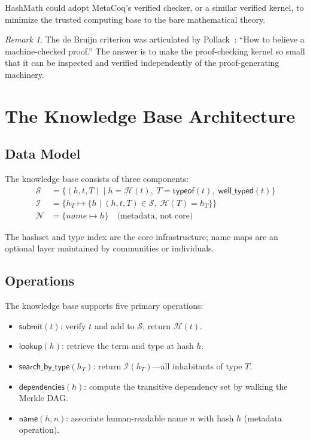\documentclass[11pt]{article}
\theoremstyle{definition}
\theoremstyle{plain}
\theoremstyle{remark}
\newtheorem{remark}{Remark}[section]
\newcommand{\hash}{\mathcal{H}}
\newcommand{\hashset}{\mathcal{S}}
\newcommand{\typeindex}{\mathcal{I}}
\newcommand{\namemap}{\mathcal{N}}
\begin{document}
HashMath could adopt MetaCoq's verified checker, or a similar verified kernel, to minimize
the trusted computing base to the bare mathematical theory.

\begin{remark}
The de Bruijn criterion was articulated by Pollack~\cite{pollack1998}: ``How to believe a
machine-checked proof.''
The answer is to make the proof-checking kernel so small that it can be inspected and verified
independently of the proof-generating machinery.
\end{remark}


\section{The Knowledge Base Architecture}
\label{sec:architecture}

\subsection{Data Model}
\label{sec:data-model}

The knowledge base consists of three components:
\begin{align*}
  \hashset &= \{ (h, t, T) \mid h = \hash(t),\; T = \textsf{typeof}(t),\; \textsf{well\_typed}(t) \} \\
  \typeindex &= \{ h_T \mapsto \{ h \mid (h, t, T) \in \hashset,\; \hash(T) = h_T \} \} \\
  \namemap &= \{ \textit{name} \mapsto h \} \quad \text{(metadata, not core)}
\end{align*}

The hashset and type index are the core infrastructure; name maps are an optional layer
maintained by communities or individuals.

\subsection{Operations}
\label{sec:operations}

The knowledge base supports five primary operations:
\begin{itemize}[nosep]
  \item $\textsf{submit}(t)$: verify $t$ and add to $\hashset$; return $\hash(t)$.
  \item $\textsf{lookup}(h)$: retrieve the term and type at hash $h$.
  \item $\textsf{search\_by\_type}(h_T)$: return $\typeindex(h_T)$---all inhabitants of type $T$.
  \item $\textsf{dependencies}(h)$: compute the transitive dependency set by walking the Merkle DAG.
  \item $\textsf{name}(h, n)$: associate human-readable name $n$ with hash $h$ (metadata operation).
\end{itemize}
\end{document}
